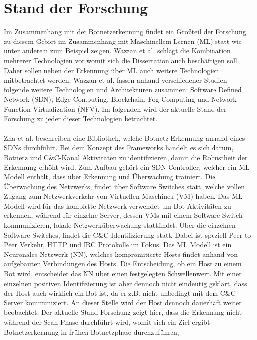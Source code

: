 \section{Stand der Forschung}
\label{sec:research}

Im Zusammenhang mit der Botnetzerkennung findet ein Großteil der Forschung zu diesem Gebiet im Zusammenhang mit Maschinellem Lernen (ML) statt wie
unter anderem zum Beispiel \cite{SAlrayes2022ModelingOB,DBLP:journals/comcom/Alani22,Habtamu2022ASR} zeigen. Wazzan et al. \cite{Wazzan2021InternetOT} schlägt die Kombination 
mehrerer Technologien vor womit sich die Dissertation auch beschäftigen soll. Daher sollen neben der Erkennung über ML auch weitere Technologien mitbetrachtet werden. Wazzan et al. 
fassen anhand verschiedener Studien folgende weitere Technologien und Architekturen zusammen: Software Defined Network (SDN), Edge Computing, Blockchain, Fog Computing und Network 
Function Virtualization (NFV). Im folgenden wird der aktuelle Stand der Forschung zu jeder dieser Technologien betrachtet. \\ \\ Zha et al. \cite{DBLP:conf/cns/Zha0GMC19} beschreiben 
eine Bibliothek, welche Botnetz Erkennung anhand eines SDNs durchführt. Bei dem Konzept des Frameworks handelt es sich darum, Botnetz und C\&C-Kanal Aktivitäten 
zu identifizieren, damit die Robustheit der Erkennung erhöht wird. Zum Aufbau gehört ein SDN Controller, welcher ein ML Modell enthält, dass über Erkennung und 
Überwachung trainiert. Die Überwachung des Netzwerks, findet über Software Switches statt, welche vollen Zugang zum Netzwerkverkehr von Virtuellen Maschinen (VM) haben.
Das ML Modell wird für das komplette Netzwerk verwendet um Bot Aktivitäten zu erkennen, während für einzelne Server, dessen VMs mit einem Software Switch kommunizieren, 
lokale Netzwerküberwachung stattfindet. Über die einzelnen Software Switches, findet die C\&C Identifizierung statt. Dabei ist speziell Peer-to-Peer Verkehr, HTTP und IRC
Protokolle im Fokus. Das ML Modell ist ein Neuronales Netzwerk (NN), welches kompromitierte Hosts findet anhand von aufgebauten Verbindungen des Hosts. Die Entscheidung, ob ein 
Host zu einem Bot wird, entscheidet das NN über einen festgelegten Schwellenwert. Mit einer einzelnen positiven Identifizierung ist aber dennoch nicht eindeutig geklärt, dass der
Host auch wirklich ein Bot ist, da er z.B. nicht unbedingt mit dem C\&C-Server kommuniziert. An dieser Stelle wird der Host dennoch dauerhaft weiter beobachtet.
Der aktuelle Stand Forschung zeigt hier, dass die Erkennung nicht während der Scan-Phase durchführt wird, womit sich ein Ziel ergibt Botnetzerkennung in frühen Botnetzphase durchzuführen,
